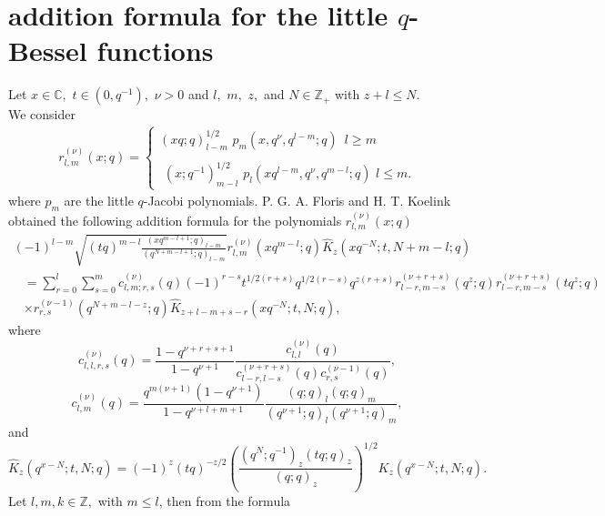 \documentclass[12pt,a4paper]{amsart}
\numberwithin{equation}{section}
\theoremstyle{plain}
\theoremstyle{definition}
\theoremstyle{remark}
\numberwithin{equation}{section}
\numberwithin{table}{section}
\numberwithin{figure}{section}
\begin{document}
\section{addition formula for the little $q$-Bessel functions}
Let $x \in \mathbb{C},$ $t\in (0,q^{-1}),$ $\nu >0$ and $l,$ $m,$
$z,$ and $N \in \mathbb{Z}_+ $ with $z+l\leq N.$\\We consider
\begin{align}
r_{l,m}^{(\nu)}(x;q)=\left\{\begin{matrix}(xq;q)_{l-m}^{1/2} \, \,p_{m}(x,q^{\nu},q^{l-m};q)\, \, \, l\geq m\\ \, \, \\
\, \, (x;q^{-1})_{m-l}^{1/2}\, \,
p_{l}(xq^{l-m},q^{\nu},q^{m-l};q)\, \,l\leq m.\end{matrix}\right .
\end{align}
where $p_{m}$ are the little $q$-Jacobi polynomials. P. G. A. Floris
and H. T. Koelink obtained the following addition formula for the
polynomials $r_{l,m}^{(\nu)}(x;q)$
\begin{align}
(-1)^{l-m}\sqrt{(tq)^{m-l}\frac{(xq^{m-l+1};q)_{l-m}}{(q^{N+m-l+1};q)_{l-m}}}r_{l,m}^{(\nu)}(xq^{m-l};q)\widehat{K}_{z}(xq^{-N};t,N+m-l;q)
\label{product}
\end{align}
\begin{align*}&=\sum_{r=0}^l\sum_{s=0}^mc_{l,m;r,s}^{(\nu)}(q)
(-1)^{r-s}t^{1/2(r+s)}q^{1/2(r-s)}q^{z(r+s)}r_{l-r,m-s}^{(\nu+r+s)}(q^z;q)r_{l-r,m-s}^{(\nu+r+s)}(tq^z;q)\\&
\times
r_{r,s}^{(\nu-1)}(q^{N+m-l-z};q)\widehat{K}_{z+l-m+s-r}(xq^{-N};t,N;q),
\end{align*}
where
\begin{equation}
c_{l,l,r,s}^{(\nu)}(q)=\frac{1-q^{\nu+r+s+1}}{1-q^{\nu+1}}\frac{c_{l,l}^{(\nu)}(q)}{c_{l-r,l-s}^{(\nu+r+s)}(q)c_{r,s}^{(\nu-1)}(q)}
\label{cc1},
\end{equation}
\begin{equation}
c^{(\nu)}_{l,m}(q)=\frac{q^{m(\nu+1)}(1-q^{\nu+1})}
{1-q^{\nu+l+m+1}}\frac{(q;q)_l(q;q)_m}{(q^{\nu+1};q)_l(q^{\nu+1};q)_m}\label{cc2},
\end{equation}
and
\begin{equation}
\widehat{K}_{z}\left(  q^{x-N};t,N;q\right)  =\left(  -1\right)
^{z}\left( tq\right) ^{-z/2}\left(  \frac{\left( q^{N};q^{-1}\right)
_{z}\left( tq;q\right)  _{z}  }{\left(  q;q\right)
_{z}}\right)  ^{1/2}K_{z}\left(  q^{x-N};t,N;q\right).\end{equation}
Let $l,m, k \in\mathbb{Z},$ with $m\leq l$, then from the formula
\end{document}
